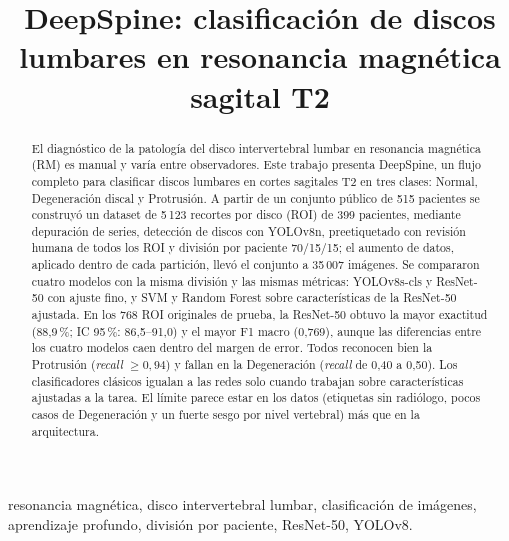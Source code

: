 \documentclass[conference,letterpaper]{IEEEtran}
\begin{document}
\title{DeepSpine: clasificación de discos lumbares en resonancia magnética sagital T2}

\author{
}

\maketitle

\begin{abstract}
El diagnóstico de la patología del disco intervertebral lumbar en resonancia magnética (RM) es manual y varía entre observadores. Este trabajo presenta DeepSpine, un flujo completo para clasificar discos lumbares en cortes sagitales T2 en tres clases: Normal, Degeneración discal y Protrusión. A partir de un conjunto público de 515 pacientes se construyó un dataset de 5\,123 recortes por disco (ROI) de 399 pacientes, mediante depuración de series, detección de discos con YOLOv8n, preetiquetado con revisión humana de todos los ROI y división por paciente 70/15/15; el aumento de datos, aplicado dentro de cada partición, llevó el conjunto a 35\,007 imágenes. Se compararon cuatro modelos con la misma división y las mismas métricas: YOLOv8s-cls y ResNet-50 con ajuste fino, y SVM y Random Forest sobre características de la ResNet-50 ajustada. En los 768 ROI originales de prueba, la ResNet-50 obtuvo la mayor exactitud (88,9\,\%; IC 95\,\%: 86,5--91,0) y el mayor F1 macro (0,769), aunque las diferencias entre los cuatro modelos caen dentro del margen de error. Todos reconocen bien la Protrusión (\emph{recall} $\geq 0{,}94$) y fallan en la Degeneración (\emph{recall} de 0,40 a 0,50). Los clasificadores clásicos igualan a las redes solo cuando trabajan sobre características ajustadas a la tarea. El límite parece estar en los datos (etiquetas sin radiólogo, pocos casos de Degeneración y un fuerte sesgo por nivel vertebral) más que en la arquitectura.
\end{abstract}

\begin{IEEEkeywords}
resonancia magnética, disco intervertebral lumbar, clasificación de imágenes, aprendizaje profundo, división por paciente, ResNet-50, YOLOv8.
\end{IEEEkeywords}
\end{document}
